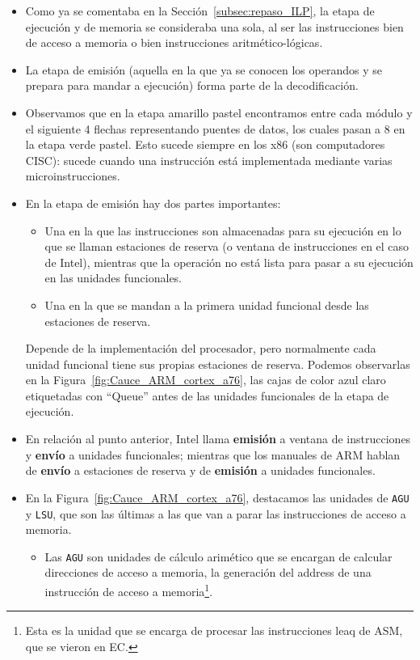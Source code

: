\begin{itemize}
    \item Como ya se comentaba en la Sección~\ref{subsec:repaso_ILP}, la etapa de ejecución y de memoria se consideraba una sola, al ser las instrucciones bien de acceso a memoria o bien instrucciones aritmético-lógicas.
    \item La etapa de emisión (aquella en la que ya se conocen los operandos y se prepara para mandar a ejecución) forma parte de la decodificación.
    \item Observamos que en la etapa amarillo pastel encontramos entre cada módulo y el siguiente 4 flechas representando puentes de datos, los cuales pasan a 8 en la etapa verde pastel. Esto sucede siempre en los x86 (son computadores CISC): sucede cuando una instrucción está implementada mediante varias microinstrucciones.
    \item En la etapa de emisión hay dos partes importantes:
        \begin{itemize}
            \item Una en la que las instrucciones son almacenadas para su ejecución en lo que se llaman estaciones de reserva (o ventana de instrucciones en el caso de Intel), mientras que la operación no está lista para pasar a su ejecución en las unidades funcionales.
            \item Una en la que se mandan a la primera unidad funcional desde las estaciones de reserva.
        \end{itemize}
        Depende de la implementación del procesador, pero normalmente cada unidad funcional tiene sus propias estaciones de reserva. Podemos observarlas en la Figura~\ref{fig:Cauce_ARM_cortex_a76}, las cajas de color azul claro etiquetadas con ``Queue'' antes de las unidades funcionales de la etapa de ejecución.
    \item En relación al punto anterior, Intel llama \textbf{emisión} a ventana de instrucciones y \textbf{envío} a unidades funcionales; mientras que los manuales de ARM hablan de \textbf{envío} a estaciones de reserva y de \textbf{emisión} a unidades funcionales.
    \item En la Figura~\ref{fig:Cauce_ARM_cortex_a76}, destacamos las unidades de \verb|AGU| y \verb|LSU|, que son las últimas a las que van a parar las instrucciones de acceso a memoria.
        \begin{itemize}
            \item Las \verb|AGU| son unidades de cálculo arimético que se encargan de calcular direcciones de acceso a memoria, la generación del address de una instrucción de acceso a memoria\footnote{Esta es la unidad que se encarga de procesar las instrucciones leaq de ASM, que se vieron en EC.}.

\end{itemize}
\end{itemize}
